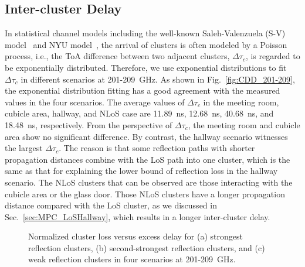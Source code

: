 \documentclass[journal,12pt,draftclsnofoot,onecolumn]{IEEEtran}
\begin{document}
\subsection{Inter-cluster Delay}
In statistical channel models including the well-known Saleh-Valenzuela (S-V) model~\cite{saleh1987statistical} and NYU model~\cite{ju2021millimeter}, the arrival of clusters is often modeled by a Poisson process, i.e., the ToA difference between two adjacent clusters, $\Delta \tau_c$, is regarded to be exponentially distributed. Therefore, we use exponential distributions to fit $\Delta \tau_c$ in different scenarios at 201-209~GHz. As shown in Fig.~\ref{fig:CDD_201-209}, the exponential distribution fitting has a good agreement with the measured values in the four scenarios. The average values of $\Delta \tau_c$ in the meeting room, cubicle area, hallway, and NLoS case are 11.89~ns, 12.68~ns, 40.68~ns, and 18.48~ns, respectively. From the perspective of $\Delta \tau_c$, the meeting room and cubicle area show no significant difference. By contrast, the hallway scenario witnesses the largest $\Delta \tau_c$. The reason is that some reflection paths with shorter propagation distances combine with the LoS path into one cluster, which is the same as that for explaining the lower bound of reflection loss in the hallway scenario. The NLoS clusters that can be observed are those interacting with the cubicle area or the glass door. Those NLoS clusters have a longer propagation distance compared with the LoS cluster, as we discussed in Sec.~\ref{sec:MPC_LoSHallway}, which results in a longer inter-cluster delay.




\begin{figure}
\centering
{}


\caption{Normalized cluster loss versus excess delay for (a) strongest reflection clusters, (b) second-strongest reflection clusters, and (c) weak reflection clusters in four scenarios at 201-209~GHz.}
\label{fig:PR} 
\end{figure}
  
\end{document}
